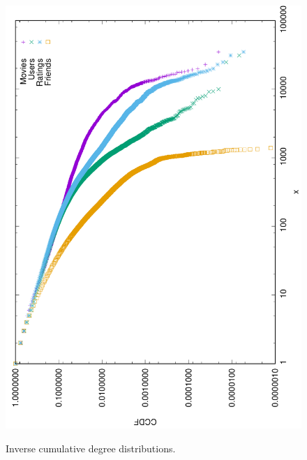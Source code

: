 \documentclass[a4paper, 11pt]{article}
\begin{document}
	\begin{figure}
		\centering
		\includegraphics[angle=-90, width=0.9\linewidth]{img/ccdfs}
		\label{fig:degrees-ccdfs}
		\caption{Inverse cumulative degree distributions.}
	\end{figure}
	
\end{document}
